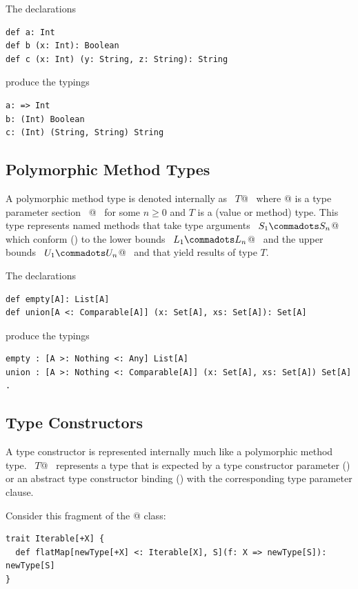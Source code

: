 \example The declarations
\begin{lstlisting}
def a: Int
def b (x: Int): Boolean
def c (x: Int) (y: String, z: String): String
\end{lstlisting}
produce the typings
\begin{lstlisting}
a: => Int
b: (Int) Boolean
c: (Int) (String, String) String
\end{lstlisting}

\subsection{Polymorphic Method Types}
\label{sec:poly-types}

A polymorphic method type is denoted internally as ~\lstinline@[$\tps\,$]$T$@~ where
\lstinline@[$\tps\,$]@ is a type parameter section 
~\lstinline@[$a_1$ >: $L_1$ <: $U_1 \commadots a_n$ >: $L_n$ <: $U_n$]@~ 
for some $n \geq 0$ and $T$ is a
(value or method) type.  This type represents named methods that
take type arguments ~\lstinline@$S_1 \commadots S_n$@~ which
conform () to the lower bounds
~\lstinline@$L_1 \commadots L_n$@~ and the upper bounds
~\lstinline@$U_1 \commadots U_n$@~ and that yield results of type $T$.

\example The declarations
\begin{lstlisting}
def empty[A]: List[A]
def union[A <: Comparable[A]] (x: Set[A], xs: Set[A]): Set[A]
\end{lstlisting}
produce the typings
\begin{lstlisting}
empty : [A >: Nothing <: Any] List[A]
union : [A >: Nothing <: Comparable[A]] (x: Set[A], xs: Set[A]) Set[A]  .
\end{lstlisting}

\subsection{Type Constructors} %
\label{sec:higherkinded-types}
A type constructor is represented internally much like a polymorphic method type.
~\lstinline@[$\pm$ $a_1$ >: $L_1$ <: $U_1 \commadots \pm a_n$ >: $L_n$ <: $U_n$] $T$@~ represents a type that is expected by a type constructor parameter () or an abstract type constructor binding () with the corresponding type parameter clause.

\example Consider this fragment of the \lstinline@Iterable[+X]@ class:
\begin{lstlisting}
trait Iterable[+X] {
  def flatMap[newType[+X] <: Iterable[X], S](f: X => newType[S]): newType[S]
}
\end{lstlisting}

